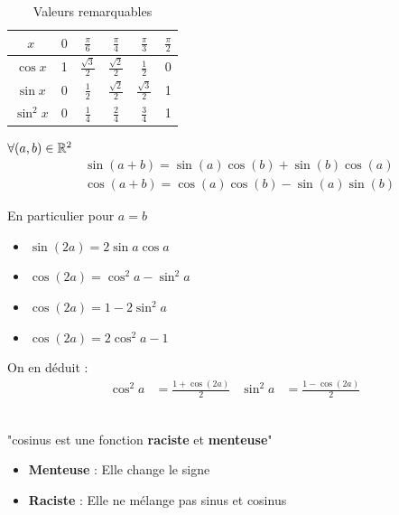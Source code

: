 \begin{table}[h!]
	\centering
	\begin{tabular}{c c c c c c}
		$x$ & $0$ & $\frac{\pi}{6}$ & $\frac{\pi}{4}$ & $\frac{\pi}{3}$ & $\frac{\pi}{2}$ \\
		\hline
		$\cos{x}$ & 1 & $\frac{\sqrt{3}}{2}$ & $\frac{\sqrt{2}}{2}$ & $\frac{1}{2}$ & 0 \\
		$\sin{x}$ & 0 & $\frac{1}{2}$ & $\frac{\sqrt{2}}{2}$ & $\frac{\sqrt{3}}{2}$ & 1 \\
		$\sin^2{x}$ & 0 & $\frac{1}{4}$ & $\frac{2}{4}$ & $\frac{3}{4}$ & 1 \\ 
		\hline
	\end{tabular}
	\caption{Valeurs remarquables}
\end{table}

\begin{graybox}
	\begin{proposition}
		$\forall (a, b) \in \mathbb{R}^2$
		\begin{align*}
			&\sin{(a+b)} = \sin{(a)}\cos{(b)} + \sin{(b)}\cos{(a)} \\
			&\cos{(a+b)} = \cos{(a)}\cos{(b)} - \sin{(a)}\sin{(b)}
		\end{align*}
	\end{proposition}
\end{graybox}

\begin{remarque}{En particulier pour $a=b$}~
	\begin{itemize}
		\item $\sin{(2a)} = 2 \sin{a}\cos{a}$
		\item $\cos{(2a)} = \cos^2{a}-\sin^2{a}$
		\item $\cos{(2a)} = 1 - 2\sin^2{a}$
		\item $\cos{(2a)} = 2\cos^2{a} - 1$
	\end{itemize}
	On en déduit :
	\begin{align*}
		\cos^2{a} &= \frac{1 + \cos{(2a)}}{2} & \sin^2{a} &= \frac{1 - \cos{(2a)}}{2}
	\end{align*}
\end{remarque}

\begin{remarque}[Mnémotechnique]~
	\\
	"cosinus est une fonction \textbf{raciste} et \textbf{menteuse}" 
	\begin{itemize}
		\item \textbf{Menteuse} : Elle change le signe
		\item \textbf{Raciste} : Elle ne mélange pas sinus et cosinus
	\end{itemize}
\end{remarque}


